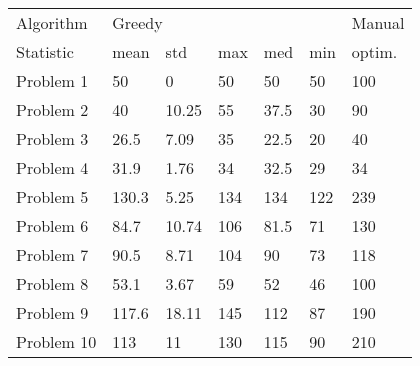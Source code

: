 \begin{tabular}{lllllll}
\toprule
Algorithm & \multicolumn{5}{l}{Greedy} & Manual \\
Statistic &   mean &    std &  max &   med &  min & optim. \\
\midrule
Problem 1  &     50 &      0 &   50 &    50 &   50 &    100 \\
Problem 2  &     40 &  10.25 &   55 &  37.5 &   30 &     90 \\
Problem 3  &   26.5 &   7.09 &   35 &  22.5 &   20 &     40 \\
Problem 4  &   31.9 &   1.76 &   34 &  32.5 &   29 &     34 \\
Problem 5  &  130.3 &   5.25 &  134 &   134 &  122 &    239 \\
Problem 6  &   84.7 &  10.74 &  106 &  81.5 &   71 &    130 \\
Problem 7  &   90.5 &   8.71 &  104 &    90 &   73 &    118 \\
Problem 8  &   53.1 &   3.67 &   59 &    52 &   46 &    100 \\
Problem 9  &  117.6 &  18.11 &  145 &   112 &   87 &    190 \\
Problem 10 &    113 &     11 &  130 &   115 &   90 &    210 \\
\bottomrule
\end{tabular}
